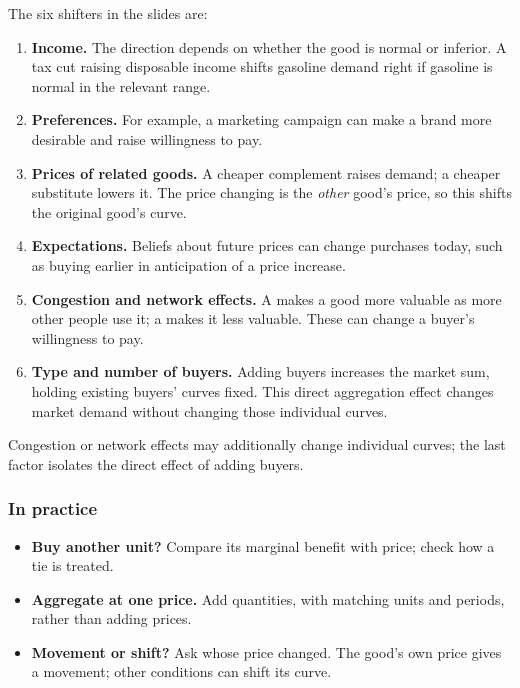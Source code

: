 The six shifters in the slides are:
\begin{enumerate}
\item \textbf{Income.} The direction depends on whether the good is normal
or inferior. A tax cut raising disposable income shifts gasoline demand
right if gasoline is normal in the relevant range.
\item \textbf{Preferences.} For example, a marketing campaign can make a
brand more desirable and raise willingness to pay.
\item \textbf{Prices of related goods.} A cheaper complement raises demand;
a cheaper substitute lowers it. The price changing is the \emph{other}
good's price, so this shifts the original good's curve.
\item \textbf{Expectations.} Beliefs about future prices can change purchases
today, such as buying earlier in anticipation of a price increase.
\item \textbf{Congestion and network effects.} A  makes a
good more valuable as more other people use it; a 
makes it less valuable. These can change a buyer's willingness to pay.
\item \textbf{Type and number of buyers.} Adding buyers increases the market
sum, holding existing buyers' curves fixed. This direct aggregation effect
changes market demand without changing those individual curves.
\end{enumerate}
Congestion or network effects may additionally change individual curves;
the last factor isolates the direct effect of adding buyers.

\subsubsection*{In practice}
\begin{itemize}
\item \textbf{Buy another unit?} Compare its marginal benefit with price;
check how a tie is treated.
\item \textbf{Aggregate at one price.} Add quantities, with matching units
and periods, rather than adding prices.
\item \textbf{Movement or shift?} Ask whose price changed. The good's own
price gives a movement; other conditions can shift its curve.
\end{itemize}
